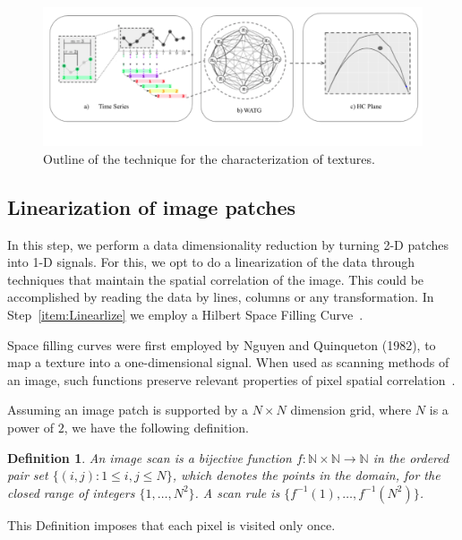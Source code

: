 \documentclass[paper=letter, fontsize=12pt]{article}
\begin{document}
	
\begin{figure}[hbt]
	\centering
	\includegraphics[scale = 0.52]{Figures/WATG.pdf}
	\vspace{-.8cm}
	\caption{Outline of the technique for the characterization of textures.}
	\label{fig:WATG}
\end{figure}

\subsection{Linearization of image patches}\label{linearization}

In this step, we perform a data dimensionality reduction by turning 2-D patches into 1-D signals.
For this, we opt to do a linearization of the data through techniques that maintain the spatial correlation of the image.
This could be accomplished by reading the data by lines, columns or any transformation.
In Step~\ref{item:Linearlize} we employ a Hilbert Space Filling Curve~\cite{Lee1994Texture}.

Space filling curves were first employed by Nguyen and Quinqueton (1982), to map a texture into a one-dimensional signal.
When used as scanning methods of an image, such functions preserve relevant properties of pixel spatial correlation~\cite{Lee1994Texture}.

Assuming an image patch is supported by a $N \times N$ dimension grid, where $N$ is a power of $2$, we have the following definition.

\newtheorem{mydef}{Definition}
\begin{mydef}
	An image scan is a bijective function $f \colon \mathbb{N} \times \mathbb{N} \to \mathbb{N}$ in the ordered pair set $ \{(i, j): 1 \leq i , j \leq N \}$, which denotes the points in the domain, for the closed range of integers $\{1, \dots, N^2\}$.
	A scan rule is $\{f^{-1}(1), \dots, f^{-1}(N^2)\}$.
	\label{def:CurveFilling}
\end{mydef}
This Definition imposes that each pixel is visited only once.
\end{document}
